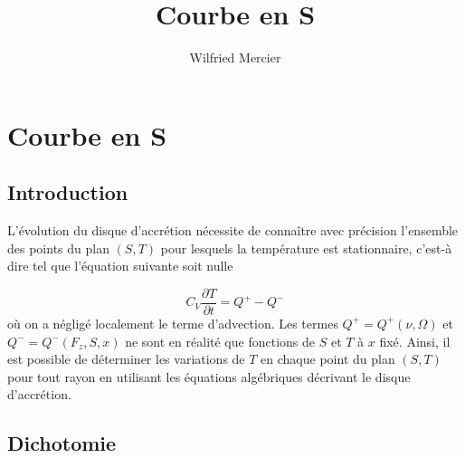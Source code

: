 \documentclass[a4paper,11pt]{article}
\title{Courbe en S}
\author{Wilfried Mercier}
\begin{document}
    \maketitle

\section{Courbe en S}
\subsection{Introduction}

    L'évolution du disque d'accrétion nécessite de connaître avec précision l'ensemble des points du plan $(S,T)$ pour lesquels la température est stationnaire, c'est-à dire tel que l'équation suivante soit nulle
    
    \begin{equation}
       C_V \frac{\partial T}{\partial t} = Q^+ - Q^-
    \end{equation}
    où on a négligé localement le terme d'advection. Les termes $Q^+ = Q^+ (\nu , \Omega)$ et $Q^- = Q^- (F_z , S , x)$ ne sont en réalité que fonctions de $S$ et $T$ à $x$ fixé. Ainsi, il est possible de déterminer les variations de $T$ en chaque point du plan $(S,T)$ pour tout rayon en utilisant les équations algébriques décrivant le disque d'accrétion.
    
\subsection{Dichotomie}
\end{document}
